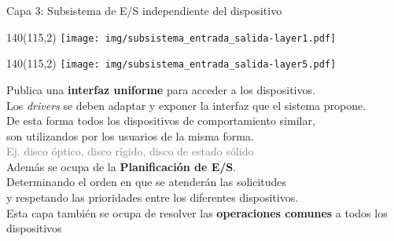 \documentclass[aspectratio=169]{beamer}
\begin{document}
\begin{frame}{Capa 3: Subsistema de E/S independiente del dispositivo}
    \begin{textblock}{140}(115,2) \texttt{[image: img/subsistema\_entrada\_salida-layer1.pdf]} \end{textblock}
    \begin{textblock}{140}(115,2) \texttt{[image: img/subsistema\_entrada\_salida-layer5.pdf]} \end{textblock}
    \vspace{0.5cm}
    Publica una \textbf{interfaz uniforme} para acceder a los dispositivos.\\
    \medskip
    Los \emph{drivers} se deben adaptar y exponer la interfaz que el sistema propone.\\
    De esta forma todos los dispositivos de comportamiento similar,\\
    son utilizandos por los usuarios de la misma forma.\\
    \textcolor{gray}{Ej. disco óptico, disco rígido, disco de estado sólido}\\
    \pause
    \bigskip
    Además se ocupa de la \textbf{Planificación de E/S}.\\
    \medskip
    Determinando el orden en que se atenderán las solicitudes\\
    y respetando las prioridades entre los diferentes dispositivos.\\
    \bigskip
    Esta capa también se ocupa de resolver las \textbf{operaciones comunes} a todos los dispositivos
\end{frame}
\end{document}
